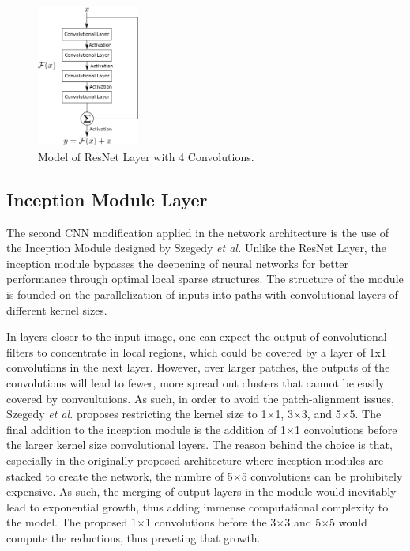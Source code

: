 \documentclass[conference]{IEEEtran}
\begin{document}
\begin{figure}
\centering
\includegraphics[width=0.3\textwidth]{figures/ResNet_Model.png}
\caption{Model of ResNet Layer with 4 Convolutions.}
\label{ResNet_Layer_Model}
\end{figure}

\subsection{Inception Module Layer}
The second CNN modification applied in the network architecture is the use of the Inception Module \cite{Szegedy2014} designed by Szegedy \emph{et al.} Unlike the ResNet Layer, the inception module bypasses the deepening of neural networks for better performance through optimal local sparse structures. The structure of the module is founded on the parallelization of inputs into paths with convolutional layers of different kernel sizes.

In layers closer to the input image, one can expect the output of convolutional filters to concentrate in local regions, which could be covered by a layer of 1x1 convolutions in the next layer. However, over larger patches, the outputs of the convolutions will lead to fewer, more spread out clusters that cannot be easily covered by convoultuions. As such, in order to avoid the patch-alignment issues, Szegedy \emph{et al.} proposes restricting the kernel size to 1$\times$1, 3$\times$3, and 5$\times$5. The final addition to the inception module is the addition of 1$\times$1 convolutions before the larger kernel size convolutional layers. The reason behind the choice is that, especially in the originally proposed architecture where inception modules are stacked to create the network, the numbre of 5$\times$5 convolutions can be prohibitely expensive. As such, the merging of output layers in the module would inevitably lead to exponential growth, thus adding immense computational complexity to the model. The proposed 1$\times$1 convolutions before the 3$\times$3 and 5$\times$5 would compute the reductions, thus preveting that growth. 
\end{document}
